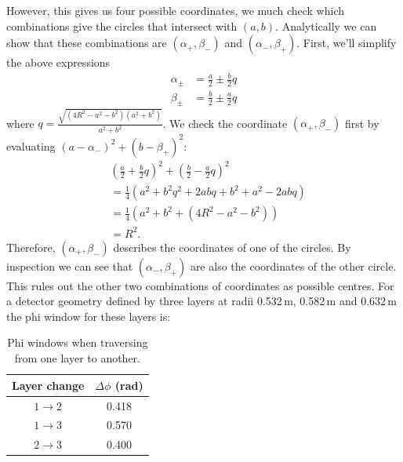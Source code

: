 \documentclass[a4paper, 12pt]{article}
\begin{document}
However, this gives us four possible coordinates, we much check which combinations give the circles that intersect with $(a, b)$.
Analytically we can show that these combinations are $(\alpha_+ , \beta_-)$ and $(\alpha_-, \beta_+)$. 
First, we'll simplify the above expressions 
\begin{align}
  \alpha_\pm &  = \frac{a}{2} \pm \frac{b}{2} q \\
  \beta_\pm & = \frac{b}{2} \pm \frac{a}{2} q
\end{align}
where $q = \frac{\sqrt{(4R^2 - a^2 - b^2)(a^2 + b^2)}}{a^2 + b^2}$. 
We check the coordinate $(\alpha_+ , \beta_-)$ first by evaluating $(a - \alpha_-)^2 + (b - \beta_+)^2$:
\begin{align}
  &  (\frac{a}{2} + \frac{b}{2}q)^2 + (\frac{b}{2} - \frac{a}{2}q)^2 \\
  & = \frac{1}{4} \left( a^2 + b^2q^2 + 2abq +b^2 + a^2 -2abq \right) \\
  & = \frac{1}{4} \left( a^2 + b^2 +(4R^2 - a^2 - b^2) \right) \\ 
  & = R^2.
\end{align}
Therefore, $(\alpha_+ , \beta_-)$ describes the coordinates of one of the circles. 
By inspection we can see that $(\alpha_- , \beta_+)$ are also the coordinates of the other circle. 
This rules out the other two combinations of coordinates as possible centres.
For a detector geometry defined by three layers at radii 0.532\,m, 0.582\,m  and 0.632\,m the phi window for these layers is:
\begin{table}
  \centering
  \begin{tabular}{cc}
    \toprule
    Layer change & $\Delta \phi$ (rad) \\
    \midrule
    $1 \rightarrow 2$ & 0.418 \\
    $1 \rightarrow 3$ & 0.570 \\
    $2 \rightarrow 3$ & 0.400 \\
    \bottomrule
  \end{tabular}
  \caption{Phi windows when traversing from one layer to another.}
\end{table}
\end{document}
